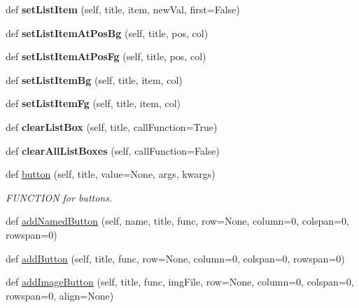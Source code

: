 \begin{DoxyCompactItemize}
def {\bfseries set\+List\+Item} (self, title, item, new\+Val, first=False)
\item 
\mbox{\label{classappjar_1_1gui_ae2358c02497b72a3f1ea99d1ee9bc035}} 
def {\bfseries set\+List\+Item\+At\+Pos\+Bg} (self, title, pos, col)
\item 
\mbox{\label{classappjar_1_1gui_adb5947f72da1f0d7f980c116263ceb6d}} 
def {\bfseries set\+List\+Item\+At\+Pos\+Fg} (self, title, pos, col)
\item 
\mbox{\label{classappjar_1_1gui_a301ed76660a61f0b9c2829fa6bd472e3}} 
def {\bfseries set\+List\+Item\+Bg} (self, title, item, col)
\item 
\mbox{\label{classappjar_1_1gui_aad9b56044e113133e144f44431a2bfe7}} 
def {\bfseries set\+List\+Item\+Fg} (self, title, item, col)
\item 
\mbox{\label{classappjar_1_1gui_a0ff7f69ddcaeba898a6ced9f51f2d4a5}} 
def {\bfseries clear\+List\+Box} (self, title, call\+Function=True)
\item 
\mbox{\label{classappjar_1_1gui_aee9a9fa5ca548b400e5804eded451885}} 
def {\bfseries clear\+All\+List\+Boxes} (self, call\+Function=False)
\item 
def \hyperlink{classappjar_1_1gui_a21ae3947977b2374ac80b900b7a87f41}{button} (self, title, value=None, args, kwargs)
\begin{DoxyCompactList}\small\item\em F\+U\+N\+C\+T\+I\+ON for buttons. \end{DoxyCompactList}\item 
def \hyperlink{classappjar_1_1gui_ab475964a93056bdc3de972f3fe3728b6}{add\+Named\+Button} (self, name, title, func, row=None, column=0, colspan=0, rowspan=0)
\item 
def \hyperlink{classappjar_1_1gui_a2a52e7f79f582a176ec2c863b929746a}{add\+Button} (self, title, func, row=None, column=0, colspan=0, rowspan=0)
\item 
def \hyperlink{classappjar_1_1gui_a3521399bb981d9d5b6af254c14a3b690}{add\+Image\+Button} (self, title, func, img\+File, row=None, column=0, colspan=0, rowspan=0, align=None)
\item 

\end{DoxyCompactItemize}
